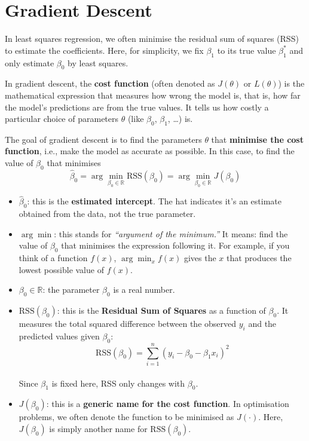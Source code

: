 \documentclass[
  letterpaper,
  DIV=11,
  numbers=noendperiod]{scrartcl}
\begin{document}
\section{Gradient Descent}\label{gradient-descent}

In least squares regression, we often minimise the residual sum of
squares (RSS) to estimate the coefficients. Here, for simplicity, we fix
\(\beta_1\) to its true value \(\beta_1^*\) and only estimate
\(\beta_0\) by least squares.

In gradient descent, the \textbf{cost function} (often denoted as
\(J(\theta)\) or \(L(\theta)\)) is the mathematical expression that
measures how wrong the model is, that is, how far the model's
predictions are from the true values. It tells us how costly a
particular choice of parameters \(\theta\) (like \(\beta_0\),
\(\beta_1\), \ldots) is.

The goal of gradient descent is to find the parameters \(\theta\) that
\textbf{minimise the cost function}, i.e., make the model as accurate as
possible. In this case, to find the value of \(\beta_0\) that minimises
\[\hat{\beta}_0 = \arg\min_{\beta_0 \in \mathbb{R}} \text{RSS}(\beta_0) = \arg\min_{\beta_0 \in \mathbb{R}} J(\beta_0)\]

\begin{itemize}
\item
  \(\hat{\beta}_0\): this is the \textbf{estimated intercept}. The hat
  indicates it's an estimate obtained from the data, not the true
  parameter.
\item
  \(\arg\min\): this stands for \emph{``argument of the minimum.''} It
  means: find the value of \(\beta_0\) that minimises the expression
  following it. For example, if you think of a function \(f(x)\),
  \(\arg\min_x f(x)\) gives the \(x\) that produces the lowest possible
  value of \(f(x)\).
\item
  \(\beta_0 \in \mathbb{R}\): the parameter \(\beta_0\) is a real
  number.
\item
  \(\text{RSS}(\beta_0)\): this is the \textbf{Residual Sum of Squares}
  as a function of \(\beta_0\). It measures the total squared difference
  between the observed \(y_i\) and the predicted values given
  \(\beta_0\):\\
  \[\text{RSS}(\beta_0) = \sum_{i=1}^{n} (y_i - \beta_0 - \beta_1 x_i)^2\]\\
  Since \(\beta_1\) is fixed here, RSS only changes with \(\beta_0\).
\item
  \(J(\beta_0)\): this is a \textbf{generic name for the cost function}.
  In optimisation problems, we often denote the function to be minimised
  as \(J(\cdot)\). Here, \(J(\beta_0)\) is simply another name for
  \(\text{RSS}(\beta_0)\).
\end{itemize}
\end{document}
